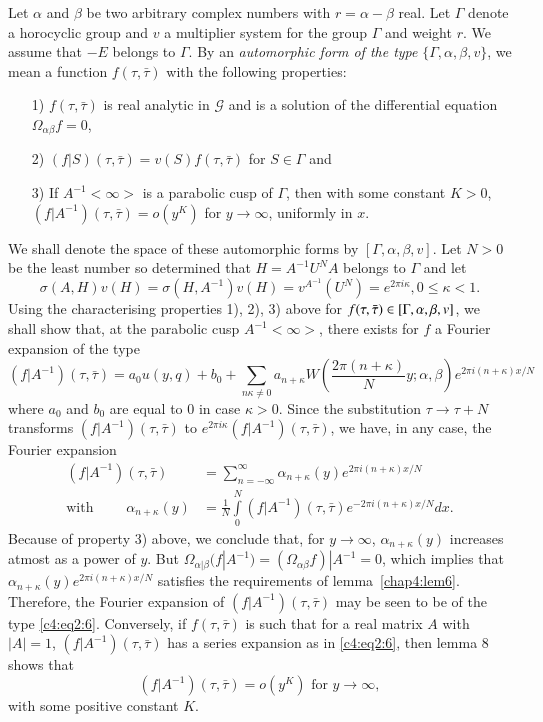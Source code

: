 Let \pageoriginale $\alpha$ and $\beta$ be two arbitrary complex numbers with
$r=\alpha-\beta$ real. Let $\Gamma$ denote a horocyclic group and $v$
a multiplier system for the group $\Gamma$ and weight $r$. We assume
that $-E$ belongs to $\Gamma$. By an \textit{automorphic form of the
  type} $\{\Gamma, \alpha, \beta, v\}$, we mean a function
$f(\tau,\bar{\tau})$ with the following properties:
\begin{itemize}
\item[1)] $f(\tau, \bar{\tau})$ is real analytic in $\mathscr{G}$ and
  is a solution of the differential equation $\Omega_{\alpha
    \beta}f=0$,

\item[2)] $(f|S)(\tau,\bar{\tau}) = v(S) f(\tau, \bar{\tau})$ for $S
  \in \Gamma$ and

\item[3)] If $A^{-1}<\infty>$ is a parabolic cusp of $\Gamma$, then
  with some constant $K>0$, $(f|A^{-1})(\tau, \bar{\tau}) = o(y^K)$
  for $y\to \infty$, uniformly in $x$.
\end{itemize}
We shall denote the space of these automorphic forms by $[\Gamma,
  \alpha, \beta, v]$. Let $N>0$ be the least number so determined that
$H=A^{-1} U^N A$ belongs to $\Gamma$ and let 
$$
\sigma(A,H) v(H) = \sigma(H,A^{-1}) v(H) = v^{A^{-1}}(U^N) = e^{2\pi i
\kappa}, 0 \leq \kappa < 1.
$$
Using the characterising properties 1), 2), 3) above for $f(\tau,
\bar{\tau}) \in [\Gamma, \alpha, \beta,\break v]$, we shall show
that, at the parabolic cusp $A^{-1}<\infty>$, there exists for $f$ a
Fourier expansion of the type 
\begin{equation*}
(f|A^{-1}) (\tau,\bar{\tau})  = a_0u(y,q) + b_0 +
\sum_{n\kappa\neq0} a_{n+\kappa} W (\frac{2\pi(n+\kappa)}{N} y;\alpha,
\beta) e^{2\pi i (n+\kappa)x/N} \tag{6}\label{c4:eq2:6}
\end{equation*}
where \pageoriginale $a_0$ and $b_0$ are equal to 0 in case $\kappa
>0$. Since the substitution $\tau\to \tau + N$ transforms
$(f|A^{-1})(\tau,\bar{\tau})$ to $e^{2\pi
  i\kappa}(f|A^{-1})(\tau,\bar{\tau})$, we have, in any case, the
Fourier expansion
\begin{align*}
(f|A^{-1}) (\tau,\bar{\tau}) & = \sum^{\infty}_{n=-\infty}
  \alpha_{n+\kappa} (y) e^{2\pi i (n+\kappa)x/N}\\
\text{with } \qquad \alpha_{n+\kappa}(y) & = \frac{1}{N}
\int\limits^N_0 (f|A^{-1}) (\tau,\bar{\tau})e^{-2\pi i(n+\kappa)x/N} dx.
\end{align*}
Because of property 3) above, we conclude that, for $y\to \infty$,
$\alpha_{n+\kappa}(y)$ increases atmost as a power of $y$. But
$\Omega_{\alpha|\beta}(f|A^{-1}) = (\Omega_{\alpha\beta} f)|A^{-1}=0$,
which implies that $\alpha_{n+\kappa}(y)e^{2\pi i(n+\kappa)x/N}$
satisfies the requirements of lemma~\ref{chap4:lem6}. Therefore, the Fourier
expansion of $(f|A^{-1})(\tau , \bar{\tau})$ may be seen to be of the
type \eqref{c4:eq2:6}. Conversely, if $f(\tau,\bar{\tau})$ is such that for a real
matrix $A$ with $|A|=1$, $(f|A^{-1})(\tau,\bar{\tau})$ has a series
expansion as in \eqref{c4:eq2:6}, then lemma 8 shows that 
$$
(f|A^{-1})(\tau,\bar{\tau}) = o(y^K) \text{ for } y \to \infty,
$$
with some positive constant $K$.

